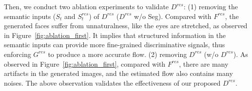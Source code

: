 Then, we conduct two ablation experiments to validate $D^{res}$: (1) removing the semantic inputs ($S_t$ and $S_t^{res}$) of $D^{res}$ ($D^{res}$ w/o Seg). 
Compared with $F^{res}$, the generated faces suffer from unnaturalness, like the eyes are stretched, as observed in Figure~\ref{fig:ablation_first}. 
It implies that structured information in the semantic inputs can provide more fine-grained discriminative signals, thus enforcing $G^{res}$ to produce a more accurate flow. 
(2) removing $D^{res}$ (w/o $D^{res}$). As observed in Figure~\ref{fig:ablation_first}, compared with $F^{res}$, there are many artifacts in the generated images, and the estimated flow also contains many noises. 
The above observation validates the effectiveness of our proposed $D^{res}$.

\begin{table}[t]

\setlength{\abovecaptionskip}{0cm}
\setlength{\belowcaptionskip}{-0.2cm}
\centering
\caption{Quantitative ablation study of $F^{swa}$ on FF++.}
\label{tab:ablation_swap}
\end{table}

